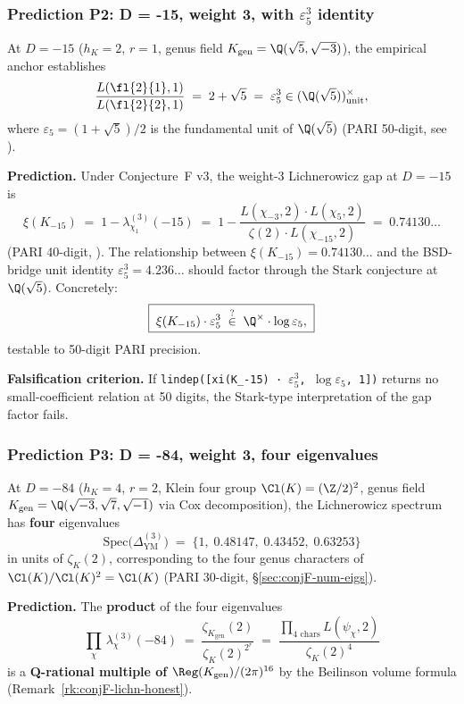\subsubsection{Prediction P2: D = -15, weight 3, with $\varepsilon_5^3$ identity}
\label{sec:conjF-predP2}

At $D = -15$ ($h_K = 2$, $r = 1$, genus field $K_{\mathrm{gen}} =
\Q(\sqrt 5, \sqrt{-3})$), the empirical anchor
\cite[Conjecture~M.D.7]{BIGTABLE2026} establishes
\[
   \frac{L(\fl{2}{1}, 1)}{L(\fl{2}{2}, 1)} \;=\;
   2 + \sqrt 5 \;=\; \varepsilon_5^3 \in (\Q(\sqrt 5))^\times_{\mathrm{unit}},
\]
where $\varepsilon_5 = (1 + \sqrt 5)/2$ is the fundamental unit of
$\Q(\sqrt 5)$ (PARI 50-digit, see \cite{BSDbridge2026}).

\textbf{Prediction.}  Under Conjecture~F v3, the
weight-$3$ Lichnerowicz gap at $D = -15$ is
\[
   \xi(K_{-15}) \;=\; 1 - \lambda_{\chi_1}^{(3)}(-15) \;=\;
   1 - \frac{L(\chi_{-3}, 2) \cdot L(\chi_5, 2)}{\zeta(2) \cdot L(\chi_{-15}, 2)}
   \;=\; 0.74130\ldots
\]
(PARI 40-digit, \cite[Table~§4.5]{LichnerowiczSpectrum2026}).  The
relationship between $\xi(K_{-15}) = 0.74130\ldots$ and the BSD-bridge
unit identity $\varepsilon_5^3 = 4.236\ldots$ should factor through
the Stark conjecture at $\Q(\sqrt 5)$.  Concretely:
\[
   \boxed{\;
   \xi(K_{-15}) \cdot \varepsilon_5^3 \;\stackrel{?}{\in}\; \Q^\times
   \cdot \log \varepsilon_5,
   \;}
\]
testable to 50-digit PARI precision.

\textbf{Falsification criterion.}  If \texttt{lindep([xi(K\_-15) ·
$\varepsilon_5^3$, $\log \varepsilon_5$, 1])} returns no small-coefficient
relation at 50 digits, the Stark-type interpretation of the gap
factor fails.

\subsubsection{Prediction P3: D = -84, weight 3, four eigenvalues}
\label{sec:conjF-predP3}

At $D = -84$ ($h_K = 4$, $r = 2$, Klein four group $\Cl(K) =
(\Z/2)^2$, genus field $K_{\mathrm{gen}} = \Q(\sqrt{-3}, \sqrt 7,
\sqrt{-1})$ via Cox decomposition), the Lichnerowicz spectrum has
{\bf four} eigenvalues
\[
   \mathrm{Spec}\bigl(\Delta_{\mathrm{YM}}^{(3)}\bigr) \;=\;
   \{1,\; 0.48147,\; 0.43452,\; 0.63253\}
\]
in units of $\zeta_K(2)$, corresponding to the four genus characters
of $\Cl(K)/\Cl(K)^2 = \Cl(K)$ (PARI 30-digit, \S\ref{sec:conjF-num-eigs}).

\textbf{Prediction.}  The {\bf product} of the four eigenvalues
\[
   \prod_{\chi}\, \lambda_\chi^{(3)}(-84)
   \;=\;
   \frac{\zeta_{K_{\mathrm{gen}}}(2)}{\zeta_K(2)^{2^r}}
   \;=\;
   \frac{\prod_{4\text{ chars}} L(\psi_\chi, 2)}{\zeta_K(2)^{4}}
\]
is a {\bf Q-rational multiple of}
$\Reg(K_{\mathrm{gen}}) / (2\pi)^{16}$ by the Beilinson volume
formula (Remark~\ref{rk:conjF-lichn-honest}).

